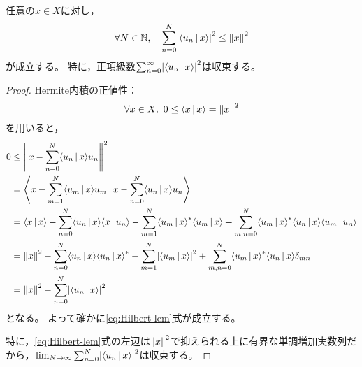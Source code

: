 \documentclass[a4paper,draft]{ltjsarticle}
\begin{document}
\begin{lem}[Besselの不等式]\label{lem:Hilbert-lem1}
    任意の$x\in X$に対し，
    \begin{equation}
        \label{eq:Hilbert-lem}
        \forall N\in \N,\quad \sum_{n=0}^N \abs{\inner{u_n}{x}}^2\leq \norm{x}^2
    \end{equation}
    が成立する。
    特に，正項級数$\sum_{n=0}^\infty \abs{\inner{u_n}{x}}^2$は収束する。
    \begin{proof}
        Hermite内積の正値性：
        \begin{equation}
            \forall x\in X,\ 0\leq \inner{x}{x}=\norm{x}^2
        \end{equation}
        を用いると，
        \begin{align}
            0&\leq \norm{x - \sum_{n=0}^N \inner{u_n}{x}u_n}^2
            \\
            &=\inner{
                x - \sum_{m=1}^N \inner{u_m}{x}u_m
            }{
                x - \sum_{n=0}^N \inner{u_n}{x}u_n
            }
            \\
            &=\inner{x}{x}
            -\sum_{n=0}^N \inner{u_n}{x}\inner{x}{u_n}
            -\sum_{m=1}^N \inner{u_m}{x}^*\inner{u_m}{x}
            +\sum_{m,n=0}^N\inner{u_m}{x}^*\inner{u_n}{x}\inner{u_m}{u_n}
            \\
            &=\norm{x}^2-\sum_{n=0}^N \inner{u_n}{x}\inner{u_n}{x}^*
            -\sum_{m=1}^N\abs{\inner{u_m}{x}}^2
            +\sum_{m,n=0}^N \inner{u_m}{x}^*\inner{u_n}{x}\delta_{mn}
            \\
            &=\norm{x}^2-\sum_{n=0}^N \abs{\inner{u_n}{x}}^2
        \end{align}
        となる。
        よって確かに\eqref{eq:Hilbert-lem}式が成立する。

        特に，\eqref{eq:Hilbert-lem}式の左辺は$\norm{x}^2$で抑えられる上に有界な単調増加実数列だから，$ \lim_{N\to\infty}\sum_{n=0}^N\abs{\inner{u_n}{x}}^2$は収束する。
    \end{proof}
\end{lem}
\end{document}
